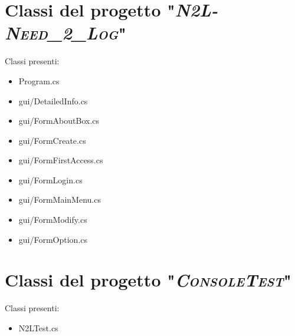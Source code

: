 \documentclass[a4paper,10pt]{report}
\begin{document}
	\section{Classi del progetto "{\scshape\itshape N2L-Need\_2\_Log}"}
  	Classi presenti:
		\begin{multicols}{2}
			\begin{itemize}
				\item Program.cs
				\item gui/DetailedInfo.cs
				\item gui/FormAboutBox.cs
				\item gui/FormCreate.cs
				\item gui/FormFirstAccess.cs
				\item gui/FormLogin.cs
				\item gui/FormMainMenu.cs
				\item gui/FormModify.cs
				\item gui/FormOption.cs
			\end{itemize}
		\end{multicols}
		
		
		
		
		
		
		
		
		
	\newpage
	\section{Classi del progetto "{\scshape\itshape ConsoleTest}"}
		Classi presenti:
		\begin{itemize}
			\item N2LTest.cs
		\end{itemize}
		
\newpage
\end{document}
